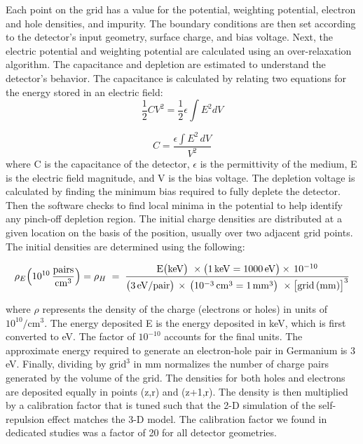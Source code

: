 Each point on the grid has a value for the potential, weighting potential, electron and hole densities, and impurity. The boundary conditions are then set according to the detector's input geometry, surface charge, and bias voltage. Next, the electric potential and weighting potential are calculated using an over-relaxation algorithm. The capacitance and depletion are estimated to understand the detector's behavior. The capacitance is calculated by relating two equations for the energy stored in an electric field:
\begin{equation}
    \frac{1}{2} C V^2 = \frac{1}{2} \epsilon \int E^2 dV
\end{equation}

\begin{equation}
    C = \frac{\epsilon \int E^2 \, dV}{V^2}
\end{equation}
where C is the capacitance of the detector, $\epsilon$ is the permittivity of the medium, E is the electric field magnitude, and V is the bias voltage. The depletion voltage is calculated by finding the minimum bias required to fully deplete the detector. Then the software checks to find local minima in the potential to help identify any pinch-off depletion region. The initial charge densities are distributed at a given location on the basis of the position, usually over two adjacent grid points. The initial densities are determined using the following:

\begin{equation}
\rho_E \Bigl(10^{10} \,\frac{\mathrm{pairs}}{\mathrm{cm^3}}\Bigr) = \rho_H  \;=\;
\frac{ \mathrm{E}\bigl(\mathrm{keV}\bigr)\ \times \bigl(1\,\mathrm{keV} = 1000\,\mathrm{eV}\bigr) \times\,10^{-10} }{\bigl(3\,\mathrm{eV/pair}\bigr)\,\times\, \bigl(10^{-3}\,\mathrm{cm}^{3} = 1\,\mathrm{mm}^3\bigr)\ \times \bigl[\text{grid}\,(\mathrm{mm})\bigr]^3 }
\label{eq:density_with_units}
\end{equation}

where $\rho$ represents the density of the charge (electrons or holes) in units of \(10^{10}/\text{cm}^3\). The energy deposited E is the energy deposited in keV, which is first converted to eV. The factor of \(10^{-10}\) accounts for the final units. The approximate energy required to generate an electron-hole pair in Germanium is $3$ eV. Finally, dividing by \(\text{grid}^3\) in mm normalizes the number of charge pairs generated by the volume of the grid. The densities for both holes and electrons are deposited equally in points (z,r) and (z+1,r). The density is then multiplied by a calibration factor that is tuned such that the 2-D simulation of the self-repulsion effect matches the 3-D model. The calibration factor we found in dedicated studies was a factor of 20 for all detector geometries.

